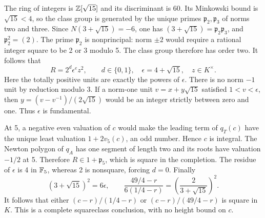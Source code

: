 The ring of integers is $\mathbb Z[\sqrt{15}]$ and its discriminant
is 60. Its Minkowski bound is $\sqrt{15}<4$, so the class group
is generated by the unique primes $\mathfrak p_2,\mathfrak p_3$
of norms two and three. Since
$N(3+\sqrt{15})=-6$, one has $(3+\sqrt{15})=\mathfrak p_2\mathfrak p_3$,
and $\mathfrak p_2^2=(2)$. The prime $\mathfrak p_2$ is
nonprincipal: norm $\pm2$ would require a rational integer square
to be 2 or 3 modulo 5. The class group therefore has order two.
It follows that
\[
 R=2^d\epsilon^e z^2,\qquad d\in\{0,1\},\quad
 \epsilon=4+\sqrt{15},\quad z\in K^\times.
\]
Here the totally positive units are exactly the powers of $\epsilon$.
There is no norm $-1$ unit by reduction modulo 3. If a norm-one unit
$v=x+y\sqrt{15}$ satisfied $1<v<\epsilon$, then
$y=(v-v^{-1})/(2\sqrt{15})$ would be an integer strictly between zero
and one. Thus $\epsilon$ is fundamental.

At 5, a negative even valuation of $c$ would make the leading term
of $q_T(c)$ have the unique least valuation $1+2v_5(c)$, an odd
number. Hence $c$ is integral. The Newton polygon of $q_A$ has one
segment of length two and its roots have valuation $-1/2$ at 5.
Therefore $R\in1+\mathfrak p_5$, which is square in the completion.
The residue of $\epsilon$ is 4 in $\mathbb F_5$, whereas 2 is
nonsquare, forcing $d=0$. Finally
\[
 (3+\sqrt{15})^2=6\epsilon,\qquad
 \frac{49/4-r}{6(1/4-r)}=
 \left(\frac{2}{3+\sqrt{15}}\right)^2.
\]
It follows that either $(c-r)/(1/4-r)$ or $(c-r)/(49/4-r)$ is square
in $K$. This is a complete squareclass conclusion, with no height
bound on $c$.

